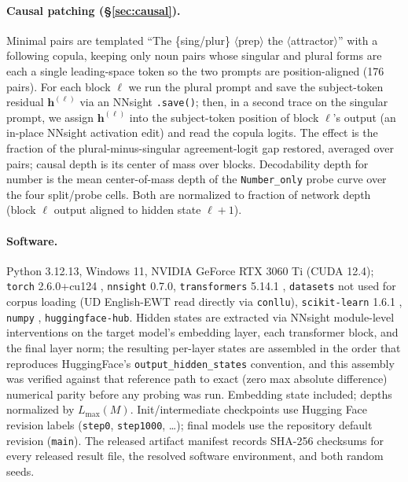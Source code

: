 \documentclass[11pt]{article}
\begin{document}
\paragraph{Causal patching (\S\ref{sec:causal}).} Minimal pairs are templated ``The \{sing/plur\} $\langle$prep$\rangle$ the $\langle$attractor$\rangle$'' with a following copula, keeping only noun pairs whose singular and plural forms are each a single leading-space token so the two prompts are position-aligned (176 pairs). For each block $\ell$ we run the plural prompt and save the subject-token residual $\mathbf{h}^{(\ell)}$ via an NNsight \texttt{.save()}; then, in a second trace on the singular prompt, we assign $\mathbf{h}^{(\ell)}$ into the subject-token position of block $\ell$'s output (an in-place NNsight activation edit) and read the copula logits. The effect is the fraction of the plural-minus-singular agreement-logit gap restored, averaged over pairs; causal depth is its center of mass over blocks. Decodability depth for number is the mean center-of-mass depth of the \texttt{Number\_only} probe curve over the four split/probe cells. Both are normalized to fraction of network depth (block $\ell$ output aligned to hidden state $\ell{+}1$).

\paragraph{Software.} Python 3.12.13, Windows 11, NVIDIA GeForce RTX 3060 Ti (CUDA 12.4); \texttt{torch} 2.6.0+cu124 \citep{paszke2019pytorch}, \texttt{nnsight} 0.7.0, \texttt{transformers} 5.14.1 \citep{wolf2020transformers}, \texttt{datasets} not used for corpus loading (UD English-EWT read directly via \texttt{conllu}), \texttt{scikit-learn} 1.6.1 \citep{pedregosa2011scikit}, \texttt{numpy} \citep{harris2020numpy}, \texttt{huggingface-hub}. Hidden states are extracted via NNsight module-level interventions on the target model's embedding layer, each transformer block, and the final layer norm; the resulting per-layer states are assembled in the order that reproduces HuggingFace's \texttt{output\_hidden\_states} convention, and this assembly was verified against that reference path to exact (zero max absolute difference) numerical parity before any probing was run. Embedding state included; depths normalized by $L_{\max}(M)$. Init/intermediate checkpoints use Hugging Face revision labels (\texttt{step0}, \texttt{step1000}, \dots); final models use the repository default revision (\texttt{main}). The released artifact manifest records SHA-256 checksums for every released result file, the resolved software environment, and both random seeds.
\end{document}
